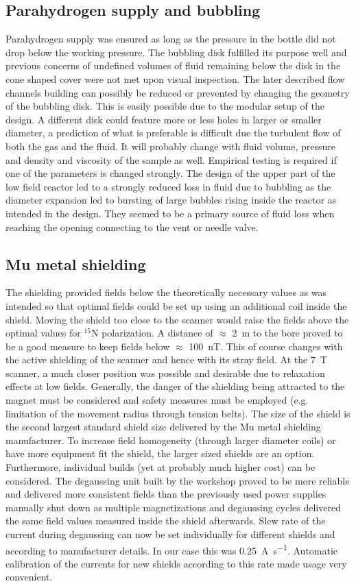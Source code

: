         \subsection{Parahydrogen supply and bubbling}
            Parahydrogen supply was ensured as long as the pressure in the bottle did not drop below the working pressure. The bubbling disk fulfilled its purpose well and previous concerns of undefined volumes of fluid remaining below the disk in the cone shaped cover were not met upon visual inspection. The later described flow channels building can possibly be reduced or prevented by changing the geometry of the bubbling disk. This is easily possible due to the modular setup of the design. A different disk could feature more or less holes in larger or smaller diameter, a prediction of what is preferable is difficult due the turbulent flow of both the gas and the fluid. It will probably change with fluid volume, pressure and density and viscosity of the sample as well. Empirical testing is required if one of the parameters is changed strongly.
            The design of the upper part of the low field reactor led to a strongly reduced loss in fluid due to bubbling as the diameter expansion led to bursting of large bubbles rising inside the reactor as intended in the design. They seemed to be a primary source of fluid loss when reaching the opening connecting to the vent or needle valve.
        \subsection{Mu metal shielding}
            The shielding provided fields below the theoretically necessary values as was intended so that optimal fields could be set up using an additional coil inside the shield. Moving the shield too close to the scanner would raise the fields above the optimal values for $^{15}$N polarization. A distance of $\approx$ \SI{2}{\meter} to the bore proved to be a good measure to keep fields below $\approx$ \SI{100}{\nano\tesla}. This of course changes with the active shielding of the scanner and hence with its stray field. At the \SI{7}{\tesla} scanner, a much closer position was possible and desirable due to relaxation effects at low fields. Generally, the danger of the shielding being attracted to the magnet must be considered and safety measures must be employed (e.g. limitation of the movement radius through tension belts). The size of the shield is the second largest standard shield size delivered by the Mu metal shielding manufacturer. To increase field homogeneity (through larger diameter coils) or have more equipment fit the shield, the larger sized shields are an option. Furthermore, individual builds (yet at probably much higher cost) can be considered.
            The degaussing unit built by the workshop proved to be more reliable and delivered more consistent fields than the previously used power supplies manually shut down as multiple magnetizations and degaussing cycles delivered the same field values measured inside the shield afterwards. Slew rate of the current during degaussing can now be set individually for different shields and according to manufacturer details. In our case this was \SI{0.25}{\ampere\per\second}. Automatic calibration of the currents for new shields according to this rate made usage very convenient.

